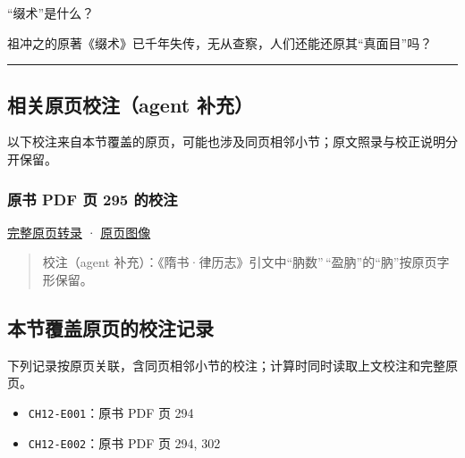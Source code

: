\documentclass[
  10pt,
  fontset=fandol]{ctexart}
\providecommand{\tightlist}{%
  \setlength{\itemsep}{0pt}\setlength{\parskip}{0pt}}
\begin{document}
``缀术''是什么？

祖冲之的原著《缀术》已千年失传，无从查察，人们还能还原其``真面目''吗？

\begin{center}\rule{0.5\linewidth}{0.5pt}\end{center}

\subsection{相关原页校注（agent 补充）}\label{ux76f8ux5173ux539fux9875ux6821ux6ce8agent-ux8865ux5145}

以下校注来自本节覆盖的原页，可能也涉及同页相邻小节；原文照录与校正说明分开保留。

\subsubsection{原书 PDF 页 295 的校注}\label{ux539fux4e66-pdf-ux9875-295-ux7684ux6821ux6ce8}

\href{../pages/pdf-295.md}{完整原页转录} · \href{../../source-images/pdf-295.jpeg}{原页图像}

\begin{quote}
校注（agent 补充）：《隋书·律历志》引文中``肭数''\,``盈肭''的``肭''按原页字形保留。
\end{quote}

\subsection{本节覆盖原页的校注记录}\label{ux672cux8282ux8986ux76d6ux539fux9875ux7684ux6821ux6ce8ux8bb0ux5f55}

下列记录按原页关联，含同页相邻小节的校注；计算时同时读取上文校注和完整原页。

\begin{itemize}
\tightlist
\item
  \texttt{CH12-E001}：原书 PDF 页 294
\item
  \texttt{CH12-E002}：原书 PDF 页 294, 302
\end{itemize}
\end{document}
